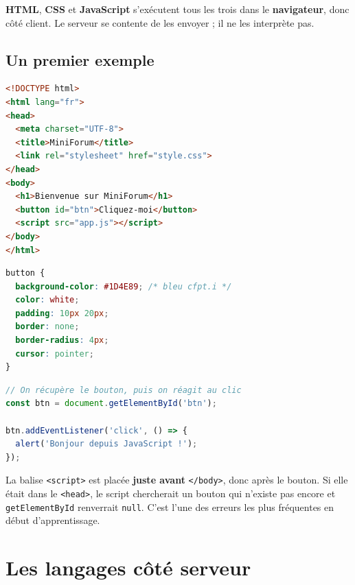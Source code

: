 \documentclass[a4paper,11pt]{article}
\begin{document}
\begin{tcolorbox}[attention, title={Important --- Qui exécute quoi ?}]
\textbf{HTML}, \textbf{CSS} et \textbf{JavaScript} s'exécutent tous les trois dans le \textbf{navigateur}, donc côté client. Le serveur se contente de les envoyer ; il ne les interprète pas.
\end{tcolorbox}

\subsection{Un premier exemple}

\begin{lstlisting}[language=HTML, caption={\texttt{index.html} --- la structure}]
<!DOCTYPE html>
<html lang="fr">
<head>
  <meta charset="UTF-8">
  <title>MiniForum</title>
  <link rel="stylesheet" href="style.css">
</head>
<body>
  <h1>Bienvenue sur MiniForum</h1>
  <button id="btn">Cliquez-moi</button>
  <script src="app.js"></script>
</body>
</html>
\end{lstlisting}

\begin{lstlisting}[language=CSS, caption={\texttt{style.css} --- la présentation}]
button {
  background-color: #1D4E89; /* bleu cfpt.i */
  color: white;
  padding: 10px 20px;
  border: none;
  border-radius: 4px;
  cursor: pointer;
}
\end{lstlisting}

\begin{lstlisting}[language=JavaScript, caption={\texttt{app.js} --- le comportement}]
// On récupère le bouton, puis on réagit au clic
const btn = document.getElementById('btn');

btn.addEventListener('click', () => {
  alert('Bonjour depuis JavaScript !');
});
\end{lstlisting}

\begin{tcolorbox}[astuce, title={L'ordre compte}]
La balise \texttt{<script>} est placée \textbf{juste avant} \texttt{</body>}, donc après le bouton. Si elle était dans le \texttt{<head>}, le script chercherait un bouton qui n'existe pas encore et \texttt{getElementById} renverrait \texttt{null}. C'est l'une des erreurs les plus fréquentes en début d'apprentissage.
\end{tcolorbox}

\section{Les langages côté serveur}
\end{document}
